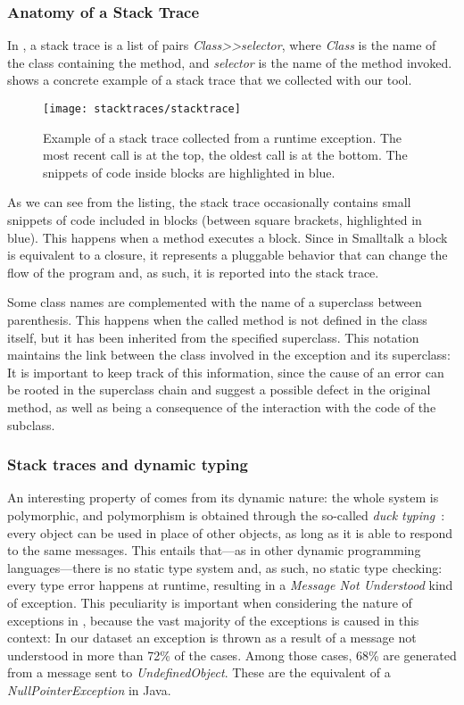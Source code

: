 \subsubsection{Anatomy of a Stack Trace}

In \pha, a stack trace is a list of pairs \textit{Class{>}{>}selector}, where \textit{Class} is the name of the class containing the method, and \textit{selector} is the name of the method invoked.
 shows a concrete example of a stack trace that we collected with our tool.

\begin{figure}[ht]
\begin{center}
  \texttt{[image: stacktraces/stacktrace]}
  \caption{Example of a stack trace collected from a runtime exception.
The most recent call is at the top, the oldest call is at the bottom.
The snippets of code inside blocks are highlighted in blue.}
  \label{fig:stacktrace}
\end{center}
\end{figure}

As we can see from the listing, the stack trace occasionally contains small snippets of code included in blocks (between square brackets, highlighted in blue).
This happens when a method executes a block.
Since in Smalltalk a block is equivalent to a closure, it represents a pluggable behavior that can change the flow of the program and, as such, it is reported into the stack trace.

Some class names are complemented with the name of a superclass between parenthesis.
This happens when the called method is not defined in the class itself, but it has been inherited from the specified superclass.
This notation maintains the link between the class involved in the exception and its superclass: It is important to keep track of this information, since the cause of an error can be rooted in the superclass chain and suggest a possible defect in the original method, as well as being a consequence of the interaction with the code of the subclass.

\subsubsection{Stack traces and dynamic typing}

An interesting property of \pha comes from its dynamic nature: the whole system is polymorphic, and polymorphism is obtained through the so-called \emph{duck typing}~\cite{Chugh2012}: every object can be used in place of other objects, as long as it is able to respond to the same messages.
This entails that---as in other dynamic programming languages---there is no static type system and, as such, no static type checking: every type error happens at runtime, resulting in a \emph{Message Not Understood} kind of exception.
This peculiarity is important when considering the nature of exceptions in \pha, because the vast majority of the exceptions is caused in this context: In our dataset an exception is thrown as a result of a message not understood in more than 72\% of the cases.
Among those cases, 68\% are generated from a message sent to \emph{UndefinedObject}.
These are the equivalent of a \emph{NullPointerException} in Java.

